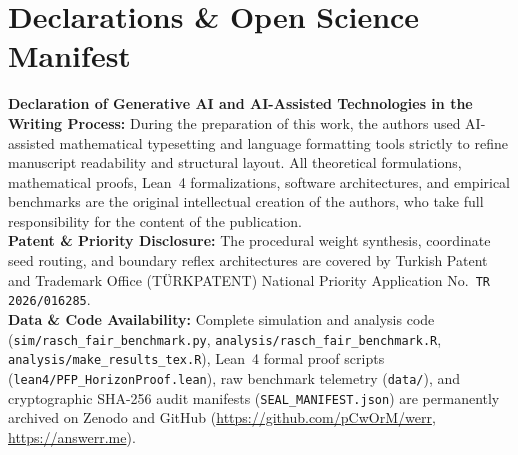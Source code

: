 \documentclass[10pt,twocolumn,a4paper]{article}
\begin{document}
\section*{Declarations \& Open Science Manifest}
\noindent \textbf{Declaration of Generative AI and AI-Assisted Technologies in the Writing Process:} During the preparation of this work, the authors used AI-assisted mathematical typesetting and language formatting tools strictly to refine manuscript readability and structural layout. All theoretical formulations, mathematical proofs, Lean~4 formalizations, software architectures, and empirical benchmarks are the original intellectual creation of the authors, who take full responsibility for the content of the publication. \\
\textbf{Patent \& Priority Disclosure:} The procedural weight synthesis, coordinate seed routing, and boundary reflex architectures are covered by Turkish Patent and Trademark Office (T\"URKPATENT) National Priority Application No.\ \texttt{TR 2026/016285}. \\
\textbf{Data \& Code Availability:} Complete simulation and analysis code (\texttt{sim/rasch\_fair\_benchmark.py}, \texttt{analysis/rasch\_fair\_benchmark.R}, \texttt{analysis/make\_results\_tex.R}), Lean~4 formal proof scripts (\texttt{lean4/PFP\_HorizonProof.lean}), raw benchmark telemetry (\texttt{data/}), and cryptographic SHA-256 audit manifests (\texttt{SEAL\_MANIFEST.json}) are permanently archived on Zenodo and GitHub (\url{https://github.com/pCwOrM/werr}, \url{https://answerr.me}).



\end{document}
